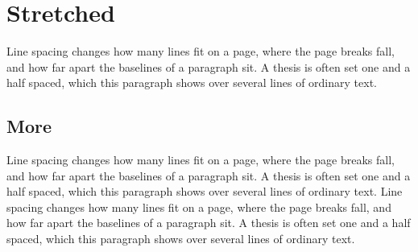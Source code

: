 \documentclass[11pt]{article}
\begin{document}
\section{Stretched}
Line spacing changes how many lines fit on a page, where the page breaks fall, and how far apart the baselines of a paragraph sit. A thesis is often set one and a half spaced, which this paragraph shows over several lines of ordinary text.
\subsection{More}
Line spacing changes how many lines fit on a page, where the page breaks fall, and how far apart the baselines of a paragraph sit. A thesis is often set one and a half spaced, which this paragraph shows over several lines of ordinary text. {\large Line spacing changes how many lines fit on a page, where the page breaks fall, and how far apart the baselines of a paragraph sit. A thesis is often set one and a half spaced, which this paragraph shows over several lines of ordinary text.} 
\end{document}
